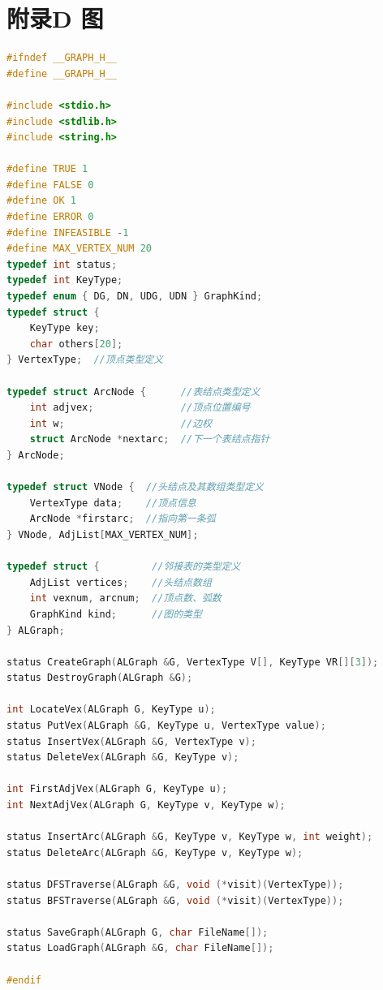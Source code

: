 \documentclass[supercite]{Experimental_Report}
\theoremstyle{definition}
\begin{document}
\section{附录D 图}
\begin{lstlisting}[caption={$graph.h$}, language=C++, frame=single]
#ifndef __GRAPH_H__
#define __GRAPH_H__

#include <stdio.h>
#include <stdlib.h>
#include <string.h>

#define TRUE 1
#define FALSE 0
#define OK 1
#define ERROR 0
#define INFEASIBLE -1
#define MAX_VERTEX_NUM 20
typedef int status;
typedef int KeyType;
typedef enum { DG, DN, UDG, UDN } GraphKind;
typedef struct {
	KeyType key;
	char others[20];
} VertexType;  //顶点类型定义

typedef struct ArcNode {      //表结点类型定义
	int adjvex;               //顶点位置编号
	int w;                    //边权
	struct ArcNode *nextarc;  //下一个表结点指针
} ArcNode;

typedef struct VNode {  //头结点及其数组类型定义
	VertexType data;    //顶点信息
	ArcNode *firstarc;  //指向第一条弧
} VNode, AdjList[MAX_VERTEX_NUM];

typedef struct {         //邻接表的类型定义
	AdjList vertices;    //头结点数组
	int vexnum, arcnum;  //顶点数、弧数
	GraphKind kind;      //图的类型
} ALGraph;

status CreateGraph(ALGraph &G, VertexType V[], KeyType VR[][3]);
status DestroyGraph(ALGraph &G);

int LocateVex(ALGraph G, KeyType u);
status PutVex(ALGraph &G, KeyType u, VertexType value);
status InsertVex(ALGraph &G, VertexType v);
status DeleteVex(ALGraph &G, KeyType v);

int FirstAdjVex(ALGraph G, KeyType u);
int NextAdjVex(ALGraph G, KeyType v, KeyType w);

status InsertArc(ALGraph &G, KeyType v, KeyType w, int weight);
status DeleteArc(ALGraph &G, KeyType v, KeyType w);

status DFSTraverse(ALGraph &G, void (*visit)(VertexType));
status BFSTraverse(ALGraph &G, void (*visit)(VertexType));

status SaveGraph(ALGraph G, char FileName[]);
status LoadGraph(ALGraph &G, char FileName[]);

#endif
\end{lstlisting}
\end{document}
